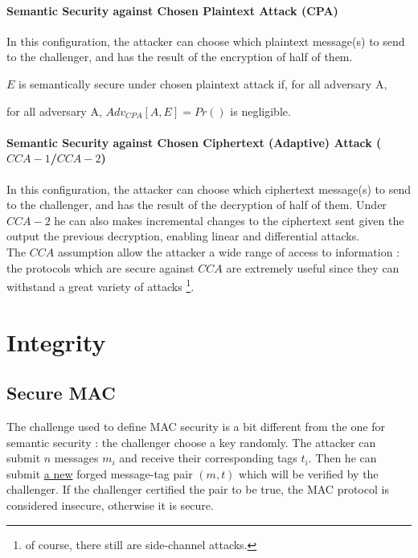 \paragraph{Semantic Security against Chosen Plaintext Attack (CPA)\\}

In this configuration, the attacker can choose which plaintext message(s) to send to the challenger, and has the result of the encryption of half of them. 

\begin{mytheorem}
$E$ is semantically secure  under chosen plaintext attack if, for all adversary A,
     
\flushright	 for all adversary A, $Adv_{CPA}[A,E] = Pr()$ is negligible.
\end{mytheorem}

\paragraph{Semantic Security against Chosen Ciphertext (Adaptive) Attack ($CCA-1$/$CCA-2$)\\}

In this configuration, the attacker can choose which ciphertext message(s) to send to the challenger, and has the result of the decryption of half of them. Under $CCA-2$ he can also makes incremental changes to the ciphertext sent given the output the previous decryption, enabling linear and differential attacks. \\
The $CCA$ assumption allow the attacker a wide range of access to information : the protocols which are secure against $CCA$ are extremely useful since they can withstand a great variety of attacks \footnote{of course, there still are side-channel attacks.}.

\section{Integrity}

\subsection{Secure MAC}

The challenge used to define MAC security is a bit different from the one for semantic security : the challenger choose a key randomly. The attacker can submit $n$ messages $m_i$ and receive their corresponding tags $t_i$. Then he can submit \underline{a new} forged message-tag pair $(m,t)$ which will be verified by the challenger. If the challenger certified the pair to be true, the MAC protocol is considered insecure, otherwise it is secure.

